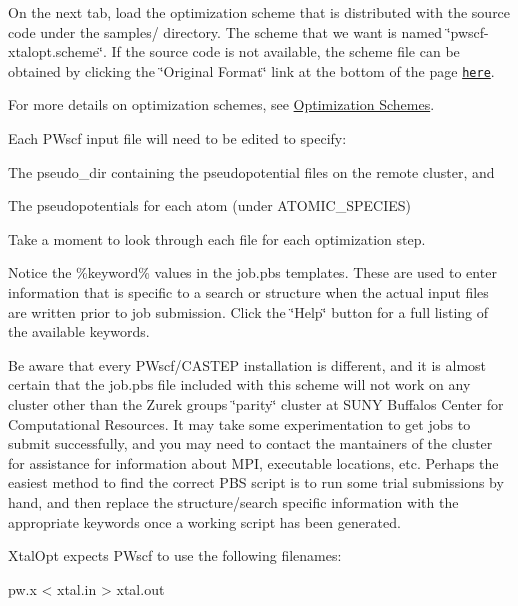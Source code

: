 On the next tab, load the optimization scheme that is distributed with the source code under the samples/ directory. The scheme that we want is named \char`\"{}pwscf-\/xtalopt.\+scheme\char`\"{}. If the source code is not available, the scheme file can be obtained by clicking the \char`\"{}\+Original Format\char`\"{} link at the bottom of the page \href{http://xtalopt.github.io/samples/pwscf-xtalopt.scheme}{\tt here}.

For more details on optimization schemes, see \hyperlink{optschemes}{Optimization Schemes}.

Each P\+Wscf input file will need to be edited to specify\+:
\begin{DoxyEnumerate}
\item The pseudo\+\_\+dir containing the pseudopotential files on the remote cluster, and
\item The pseudopotentials for each atom (under A\+T\+O\+M\+I\+C\+\_\+\+S\+P\+E\+C\+I\+E\+S)
\end{DoxyEnumerate}

Take a moment to look through each file for each optimization step.

Notice the \%keyword\% values in the job.\+pbs templates. These are used to enter information that is specific to a search or structure when the actual input files are written prior to job submission. Click the \char`\"{}\+Help\char`\"{} button for a full listing of the available keywords.

Be aware that every P\+Wscf/\+C\+A\+S\+T\+E\+P installation is different, and it is almost certain that the job.\+pbs file included with this scheme will not work on any cluster other than the Zurek group\textquotesingle{}s \char`\"{}parity\char`\"{} cluster at S\+U\+N\+Y Buffalo\textquotesingle{}s Center for Computational Resources. It may take some experimentation to get jobs to submit successfully, and you may need to contact the mantainers of the cluster for assistance for information about M\+P\+I, executable locations, etc. Perhaps the easiest method to find the correct P\+B\+S script is to run some trial submissions by hand, and then replace the structure/search specific information with the appropriate keywords once a working script has been generated.

Xtal\+Opt expects P\+Wscf to use the following filenames\+:


\begin{DoxyCode}
pw.x < xtal.in > xtal.out
\end{DoxyCode}



